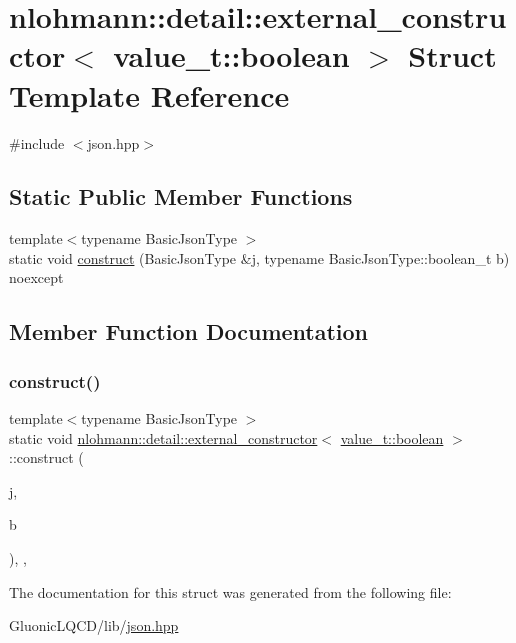 \hypertarget{structnlohmann_1_1detail_1_1external__constructor_3_01value__t_1_1boolean_01_4}{}\section{nlohmann\+::detail\+::external\+\_\+constructor$<$ value\+\_\+t\+::boolean $>$ Struct Template Reference}
\label{structnlohmann_1_1detail_1_1external__constructor_3_01value__t_1_1boolean_01_4}


{\ttfamily \#include $<$json.\+hpp$>$}

\subsection*{Static Public Member Functions}
\begin{DoxyCompactItemize}
\item 
{\footnotesize template$<$typename Basic\+Json\+Type $>$ }\\static void \mbox{\hyperlink{structnlohmann_1_1detail_1_1external__constructor_3_01value__t_1_1boolean_01_4_a867122bcf0856c757bd6bcbfb8be74bc}{construct}} (Basic\+Json\+Type \&j, typename Basic\+Json\+Type\+::boolean\+\_\+t b) noexcept
\end{DoxyCompactItemize}


\subsection{Member Function Documentation}
\mbox{\label{structnlohmann_1_1detail_1_1external__constructor_3_01value__t_1_1boolean_01_4_a867122bcf0856c757bd6bcbfb8be74bc}} 
\subsubsection{\texorpdfstring{construct()}{construct()}}
{\footnotesize\ttfamily template$<$typename Basic\+Json\+Type $>$ \\
static void \mbox{\hyperlink{structnlohmann_1_1detail_1_1external__constructor}{nlohmann\+::detail\+::external\+\_\+constructor}}$<$ \mbox{\hyperlink{namespacenlohmann_1_1detail_a90aa5ef615aa8305e9ea20d8a947980fa84e2c64f38f78ba3ea5c905ab5a2da27}{value\+\_\+t\+::boolean}} $>$\+::construct (\begin{DoxyParamCaption}\item[{Basic\+Json\+Type \&}]{j,  }\item[{typename Basic\+Json\+Type\+::boolean\+\_\+t}]{b }\end{DoxyParamCaption})\hspace{0.3cm}{\ttfamily [inline]}, {\ttfamily [static]}, {\ttfamily [noexcept]}}



The documentation for this struct was generated from the following file\+:\begin{DoxyCompactItemize}
\item 
Gluonic\+L\+Q\+C\+D/lib/\mbox{\hyperlink{json_8hpp}{json.\+hpp}}\end{DoxyCompactItemize}
